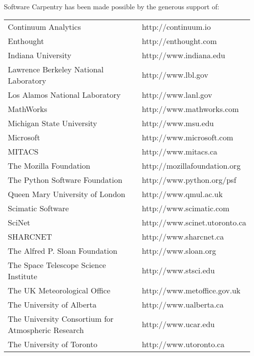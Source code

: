 Software Carpentry has been made possible by the generous support of:

\begin{tabular}{ll}
Continuum Analytics & http://continuum.io \\
Enthought & http://enthought.com \\
Indiana University & http://www.indiana.edu \\
Lawrence Berkeley National Laboratory & http://www.lbl.gov \\
Los Alamos National Laboratory & http://www.lanl.gov \\
MathWorks & http://www.mathworks.com \\
Michigan State University & http://www.msu.edu \\
Microsoft & http://www.microsoft.com \\
MITACS & http://www.mitacs.ca \\
The Mozilla Foundation & http://mozillafoundation.org \\
The Python Software Foundation & http://www.python.org/psf \\
Queen Mary University of London & http://www.qmul.ac.uk \\
Scimatic Software & http://www.scimatic.com \\
SciNet & http://www.scinet.utoronto.ca \\
SHARCNET & http://www.sharcnet.ca \\
The Alfred P. Sloan Foundation & http://www.sloan.org \\
The Space Telescope Science Institute & http://www.stsci.edu \\
The UK Meteorological Office & http://www.metoffice.gov.uk \\
The University of Alberta & http://www.ualberta.ca \\
The University Consortium for Atmospheric Research & http://www.ucar.edu \\
The University of Toronto & http://www.utoronto.ca \\
\end{tabular}
